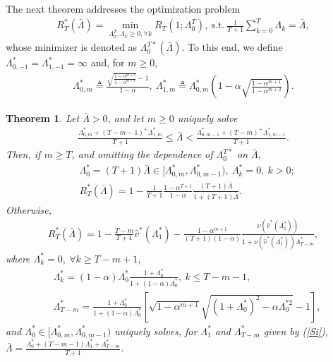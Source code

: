 \documentclass[10pt,twocolumn,twoside]{IEEEtran}
\newtheorem{thm}{Theorem}
\theoremstyle{plain}
\begin{document}
\noindent The next theorem 
addresses the optimization problem
\begin{align}
\label{RTstar}
\!\!\!\!R_T^*(\bar\Lambda)=\!\!\!\min_{\Lambda_0^T,\Lambda_k\geq 0,\forall k} R_T(1;\Lambda_0^{T}),
\ \text{s.t.}\ 
\frac{1}{T+1}\sum_{k=0}^T\Lambda_k=\bar\Lambda,
\end{align}  
whose minimizer is denoted as $\Lambda_0^{T*}(\bar\Lambda)$.
  To this end, we define $\Lambda_{0,-1}^*=\Lambda_{1,-1}^*=\infty$ and, for $m\geq 0$,
 \begin{align*}
\Lambda_{0,m}^*\!\!\triangleq\!\!\frac{\sqrt{\frac{1-\alpha^{m+2}}{1-\alpha^{m+1}}}-1}{1-\alpha},\ 
\Lambda_{1,m}^*\!\!\triangleq\!\!\Lambda_{0,m}^*\left(\!\!1\!-\!\alpha\sqrt{\frac{1-\alpha^{m+1}}{1-\alpha^{m+2}}}\right)\!\!.
\end{align*}
\begin{thm} 
 \label{thm3}
 Let $\bar \Lambda>0$, and let $m\geq 0$ uniquely solve
 \begin{align}
\label{cond}
\!\!\!\!\!\frac{\Lambda_{0,m}^*\!\!\!+\!(T\!-\!m\!-\!1)^+\!\Lambda_{1,m}^*}{T+1}\!\!\leq\!\!\bar \Lambda\!\!<\!\!\frac{\Lambda_{0,m-1}^*\!\!+\!(T\!-\!m)^+\!\Lambda_{1,m-1}^*}{T+1}.\!\!\!
\end{align}
Then, if $m\geq T$, and omitting the dependence of $\Lambda_0^{T*}$ on $\bar \Lambda$,
\begin{align}
&\Lambda_0^*=(T+1)\bar \Lambda\in [\Lambda_{0,m}^*,\Lambda_{0,m-1}^*),\ \Lambda_k^*=0,\ k>0;
\\&
\label{RT1}
R_T^*(\bar\Lambda)=1-\frac{1}{T+1}\frac{1-\alpha^{T+1}}{1-\alpha}\frac{(T+1)\bar \Lambda}{1+(T+1)\bar \Lambda}.
\end{align}
Otherwise,
\begin{align*}
\!\!R_T^*(\bar\Lambda)
\!\!=\!\!
1\!-\!\frac{T\!-\!m}{T\!+\!1}\hat v^*(\Lambda_1^*)
\!-\!\frac{1-\alpha^{m+1}}{(T\!+\!1)(1\!-\!\alpha)}
\frac{\nu(\hat v^*(\Lambda_1^*))}
{1\!+\!\nu(\hat v^*(\Lambda_1^*))\Lambda_{T-m}^*\!\!\!\!\!\!\!},
\end{align*}
where $\Lambda_{k}^*=0,\ \forall k\geq T-m+1$,
 \begin{align}
\label{Si}
&\Lambda_k^*=(1-\alpha)\Lambda_0^*\frac{1+\Lambda_0^*}{1+(1-\alpha)\Lambda_0^*},\ k\leq T-m-1,\\
&\Lambda_{T-m}^*\!\!=\!\!\frac{1+\Lambda_0^*}{1\!+\!(1\!-\!\alpha)\Lambda_0^*}\!\!\left[\!\!\sqrt{1\!-\!\alpha^{m+1}}\sqrt{(1\!+\!\Lambda_0^*)^2\!-\!\alpha\Lambda_0^{*2}}\!-\!1\!\right],
\nonumber
\end{align}
and $\Lambda_0^*{\in}[\Lambda_{0,m}^*,\Lambda_{0,m-1}^*)$ uniquely solves, for $\Lambda_1^*$ and $\Lambda_{T-m}^*$ given by (\ref{Si}),
 $\bar \Lambda{=}\frac{\Lambda_0^*+(T-m-1)\Lambda_1^*+\Lambda_{T-m}^*}{T+1}$.
  \end{thm}
\end{document}
